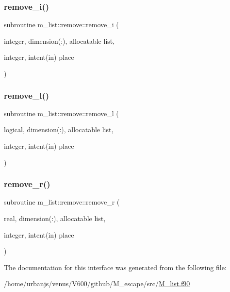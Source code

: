 \mbox{\label{interfacem__list_1_1remove_a7a269ce865e3e5fec02a9a2a49f3c832}} 
\subsubsection{\texorpdfstring{remove\+\_\+i()}{remove\_i()}}
{\footnotesize\ttfamily subroutine m\+\_\+list\+::remove\+::remove\+\_\+i (\begin{DoxyParamCaption}\item[{integer, dimension(\+:), allocatable}]{list,  }\item[{integer, intent(in)}]{place }\end{DoxyParamCaption})\hspace{0.3cm}{\ttfamily [private]}}

\mbox{\label{interfacem__list_1_1remove_ab2eefaeadd492f0256efaf3a27ba3126}} 
\subsubsection{\texorpdfstring{remove\+\_\+l()}{remove\_l()}}
{\footnotesize\ttfamily subroutine m\+\_\+list\+::remove\+::remove\+\_\+l (\begin{DoxyParamCaption}\item[{logical, dimension(\+:), allocatable}]{list,  }\item[{integer, intent(in)}]{place }\end{DoxyParamCaption})\hspace{0.3cm}{\ttfamily [private]}}

\mbox{\label{interfacem__list_1_1remove_ab1ff763ace170a3e1cd6df7a42bbe729}} 
\subsubsection{\texorpdfstring{remove\+\_\+r()}{remove\_r()}}
{\footnotesize\ttfamily subroutine m\+\_\+list\+::remove\+::remove\+\_\+r (\begin{DoxyParamCaption}\item[{real, dimension(\+:), allocatable}]{list,  }\item[{integer, intent(in)}]{place }\end{DoxyParamCaption})\hspace{0.3cm}{\ttfamily [private]}}



The documentation for this interface was generated from the following file\+:\begin{DoxyCompactItemize}
\item 
/home/urbanjs/venus/\+V600/github/\+M\+\_\+escape/src/\mbox{\hyperlink{M__list_8f90}{M\+\_\+list.\+f90}}\end{DoxyCompactItemize}
